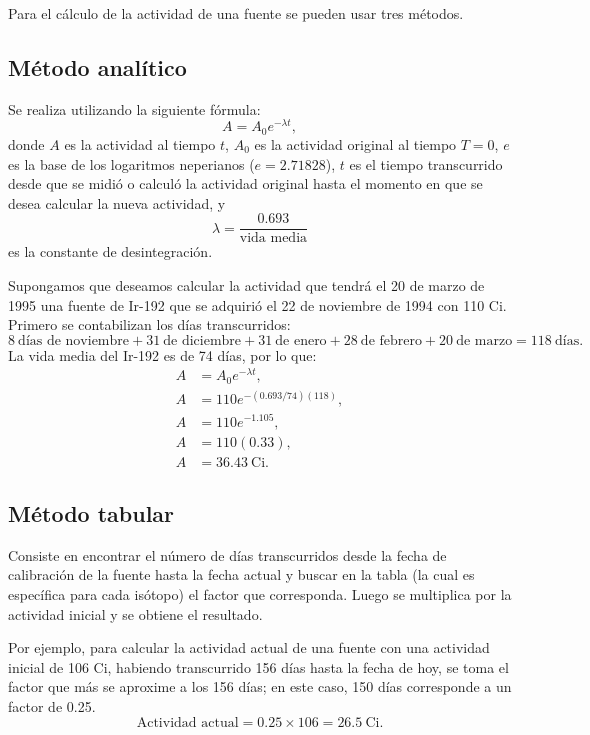 Para el cálculo de la actividad de una fuente se pueden usar tres métodos.

\subsection{Método analítico}

Se realiza utilizando la siguiente fórmula:
\[
A=A_0e^{-\lambda t},
\]
donde $A$ es la actividad al tiempo $t$, $A_0$ es la actividad original al tiempo $T=0$, $e$ es la base de los logaritmos neperianos ($e=2.71828$), $t$ es el tiempo transcurrido desde que se midió o calculó la actividad original hasta el momento en que se desea calcular la nueva actividad, y
\[
\lambda=\frac{0.693}{\text{vida media}}
\]
es la constante de desintegración.

Supongamos que deseamos calcular la actividad que tendrá el 20 de marzo de 1995 una fuente de Ir-192 que se adquirió el 22 de noviembre de 1994 con 110 Ci. Primero se contabilizan los días transcurridos:
\[
8\ \text{días de noviembre}+31\ \text{de diciembre}+31\ \text{de enero}
+28\ \text{de febrero}+20\ \text{de marzo}=118\ \text{días}.
\]
La vida media del Ir-192 es de 74 días, por lo que:
\begin{align*}
 A &= A_0e^{-\lambda t},\\
 A &= 110e^{-(0.693/74)(118)},\\
 A &= 110e^{-1.105},\\
 A &= 110(0.33),\\
 A &= 36.43\ \mathrm{Ci}.
\end{align*}

\subsection{Método tabular}

Consiste en encontrar el número de días transcurridos desde la fecha de calibración de la fuente hasta la fecha actual y buscar en la tabla (la cual es específica para cada isótopo) el factor que corresponda. Luego se multiplica por la actividad inicial y se obtiene el resultado.

Por ejemplo, para calcular la actividad actual de una fuente con una actividad inicial de 106 Ci, habiendo transcurrido 156 días hasta la fecha de hoy, se toma el factor que más se aproxime a los 156 días; en este caso, 150 días corresponde a un factor de 0.25.
\[
\text{Actividad actual}=0.25\times 106=26.5\ \mathrm{Ci}.
\]

